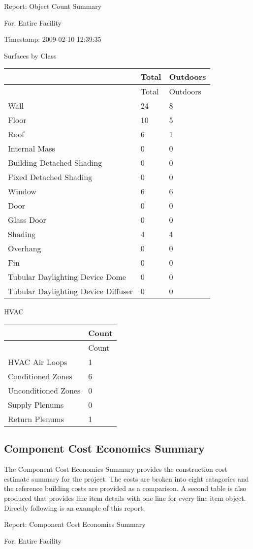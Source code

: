 Report: Object Count Summary

For: Entire Facility

Timestamp: 2009-02-10 12:39:35

Surfaces by Class

\begin{longtable}[c]{@{}lll@{}}
\toprule 
~ & Total & Outdoors \tabularnewline
\midrule
\endfirsthead

\toprule 
~ & Total & Outdoors \tabularnewline
\midrule
\endhead

Wall & 24 & 8 \tabularnewline
Floor & 10 & 5 \tabularnewline
Roof & 6 & 1 \tabularnewline
Internal Mass & 0 & 0 \tabularnewline
Building Detached Shading & 0 & 0 \tabularnewline
Fixed Detached Shading & 0 & 0 \tabularnewline
Window & 6 & 6 \tabularnewline
Door & 0 & 0 \tabularnewline
Glass Door & 0 & 0 \tabularnewline
Shading & 4 & 4 \tabularnewline
Overhang & 0 & 0 \tabularnewline
Fin & 0 & 0 \tabularnewline
Tubular Daylighting Device Dome & 0 & 0 \tabularnewline
Tubular Daylighting Device Diffuser & 0 & 0 \tabularnewline
\bottomrule
\end{longtable}

HVAC

\begin{longtable}[c]{@{}ll@{}}
\toprule 
~ & Count \tabularnewline
\midrule
\endfirsthead

\toprule 
~ & Count \tabularnewline
\midrule
\endhead

HVAC Air Loops & 1 \tabularnewline
Conditioned Zones & 6 \tabularnewline
Unconditioned Zones & 0 \tabularnewline
Supply Plenums & 0 \tabularnewline
Return Plenums & 1 \tabularnewline
\bottomrule
\end{longtable}

\subsection{Component Cost Economics Summary}\label{component-cost-economics-summary}

The Component Cost Economics Summary provides the construction cost estimate summary for the project. The costs are broken into eight catagories and the reference building costs are provided as a comparison. A second table is also produced that provides line item details with one line for every line item object. Directly following is an example of this report.

Report: Component Cost Economics Summary

For: Entire Facility

